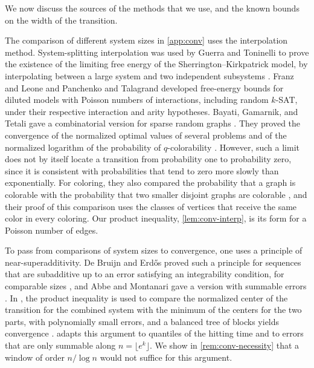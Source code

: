 We now discuss the sources of the methods that we use, and the known bounds on the width of the transition.

The comparison of different system sizes in \cref{app:conv} uses the interpolation method. System-splitting interpolation was used by Guerra and Toninelli to prove the existence of the limiting free energy of the Sherrington--Kirkpatrick model, by interpolating between a large system and two independent subsystems \cite[Section~3]{guerra2002thermodynamic}. Franz and Leone \cite{franz2003replicaa} and Panchenko and Talagrand \cite{panchenko2004bounds} developed free-energy bounds for diluted models with Poisson numbers of interactions, including random $k$-SAT, under their respective interaction and arity hypotheses. Bayati, Gamarnik, and Tetali gave a combinatorial version for sparse random graphs \cite{bayati2013combinatorial}. They proved the convergence of the normalized optimal values of several problems and of the normalized logarithm of the probability of $q$-colorability \cite[Theorem~1]{bayati2013combinatorial}. However, such a limit does not by itself locate a transition from probability one to probability zero, since it is consistent with probabilities that tend to zero more slowly than exponentially. For coloring, they also compared the probability that a graph is colorable with the probability that two smaller disjoint graphs are colorable \cite[Theorem~5 and Proposition~2]{bayati2013combinatorial}, and their proof of this comparison uses the classes of vertices that receive the same color in every coloring. Our product inequality, \cref{lem:conv-interp}, is its form for a Poisson number of edges.

To pass from comparisons of system sizes to convergence, one uses a principle of near-superadditivity. De Bruijn and Erdős proved such a principle for sequences that are subadditive up to an error satisfying an integrability condition, for comparable sizes \cite[Theorem~23]{debruijn1952some}, and Abbe and Montanari gave a version with summable errors \cite[arXiv:1006.3786v1, Section~4.3, Lemma~8 and Remark~3]{abbe2014concentration}. In \cite[Section~5]{openai2026limiting}, the product inequality \cite[Lemma~5.2]{openai2026limiting} is used to compare the normalized center of the transition for the combined system with the minimum of the centers for the two parts, with polynomially small errors, and a balanced tree of blocks yields convergence \cite[Lemma~5.4]{openai2026limiting}.  adapts this argument to quantiles of the hitting time and to errors that are only summable along $n = \lfloor e^k \rfloor$. We show in \cref{rem:conv-necessity} that a window of order $n/\log n$ would not suffice for this argument.

